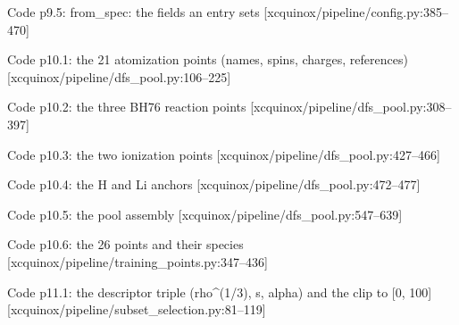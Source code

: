 \begin{frame}[allowframebreaks]{Code p9.5: from\_spec: the fields an entry sets [xcquinox/pipeline/config.py:385--470]}
\label{code:p9_5_from_spec_the_fields_an_entry_sets}
\end{frame}
\begin{frame}[allowframebreaks]{Code p10.1: the 21 atomization points (names, spins, charges, references) [xcquinox/pipeline/dfs\_pool.py:106--225]}
\label{code:p10_1_the_21_atomization_points_names_spins_ch}
\end{frame}
\begin{frame}[allowframebreaks]{Code p10.2: the three BH76 reaction points [xcquinox/pipeline/dfs\_pool.py:308--397]}
\label{code:p10_2_the_three_bh76_reaction_points}
\end{frame}
\begin{frame}[allowframebreaks]{Code p10.3: the two ionization points [xcquinox/pipeline/dfs\_pool.py:427--466]}
\label{code:p10_3_the_two_ionization_points}
\end{frame}
\begin{frame}[allowframebreaks]{Code p10.4: the H and Li anchors [xcquinox/pipeline/dfs\_pool.py:472--477]}
\label{code:p10_4_the_h_and_li_anchors}
\end{frame}
\begin{frame}[allowframebreaks]{Code p10.5: the pool assembly [xcquinox/pipeline/dfs\_pool.py:547--639]}
\label{code:p10_5_the_pool_assembly}
\end{frame}
\begin{frame}[allowframebreaks]{Code p10.6: the 26 points and their species [xcquinox/pipeline/training\_points.py:347--436]}
\label{code:p10_6_the_26_points_and_their_species}
\end{frame}
\begin{frame}[allowframebreaks]{Code p11.1: the descriptor triple (rho\^{}(1/3), s, alpha) and the clip to [0, 100] [xcquinox/pipeline/subset\_selection.py:81--119]}
\label{code:p11_1_the_descriptor_triple_rho_1_3_s_alpha_an}
\end{frame}
